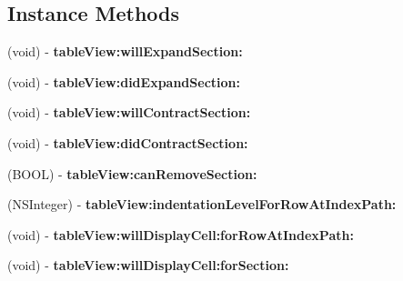 \subsection*{Instance Methods}
\begin{DoxyCompactItemize}
\item 
\hypertarget{protocol_expandable_table_view_delegate-p_a41963be2a97e36e5e40e26eb9217dda3}{(void) -\/ {\bfseries table\-View\-:will\-Expand\-Section\-:}}\label{protocol_expandable_table_view_delegate-p_a41963be2a97e36e5e40e26eb9217dda3}

\item 
\hypertarget{protocol_expandable_table_view_delegate-p_a175747929b3e82561ccfe798b98e1cbc}{(void) -\/ {\bfseries table\-View\-:did\-Expand\-Section\-:}}\label{protocol_expandable_table_view_delegate-p_a175747929b3e82561ccfe798b98e1cbc}

\item 
\hypertarget{protocol_expandable_table_view_delegate-p_a67ea16ced8ce4f2e1db23d3f0824cb6b}{(void) -\/ {\bfseries table\-View\-:will\-Contract\-Section\-:}}\label{protocol_expandable_table_view_delegate-p_a67ea16ced8ce4f2e1db23d3f0824cb6b}

\item 
\hypertarget{protocol_expandable_table_view_delegate-p_a4ee6f2489d54bbbee8d2fa6c5624badc}{(void) -\/ {\bfseries table\-View\-:did\-Contract\-Section\-:}}\label{protocol_expandable_table_view_delegate-p_a4ee6f2489d54bbbee8d2fa6c5624badc}

\item 
\hypertarget{protocol_expandable_table_view_delegate-p_a777494ee20ac4b480b61642c04226143}{(B\-O\-O\-L) -\/ {\bfseries table\-View\-:can\-Remove\-Section\-:}}\label{protocol_expandable_table_view_delegate-p_a777494ee20ac4b480b61642c04226143}

\item 
\hypertarget{protocol_expandable_table_view_delegate-p_a546007964f8f100d64457b351f266f6f}{(N\-S\-Integer) -\/ {\bfseries table\-View\-:indentation\-Level\-For\-Row\-At\-Index\-Path\-:}}\label{protocol_expandable_table_view_delegate-p_a546007964f8f100d64457b351f266f6f}

\item 
\hypertarget{protocol_expandable_table_view_delegate-p_a776dd1bfa2624d74c8b96108739688e0}{(void) -\/ {\bfseries table\-View\-:will\-Display\-Cell\-:for\-Row\-At\-Index\-Path\-:}}\label{protocol_expandable_table_view_delegate-p_a776dd1bfa2624d74c8b96108739688e0}

\item 
\hypertarget{protocol_expandable_table_view_delegate-p_aa986c62cf513db2481f06f41e0ae5d7c}{(void) -\/ {\bfseries table\-View\-:will\-Display\-Cell\-:for\-Section\-:}}\label{protocol_expandable_table_view_delegate-p_aa986c62cf513db2481f06f41e0ae5d7c}


\end{DoxyCompactItemize}
